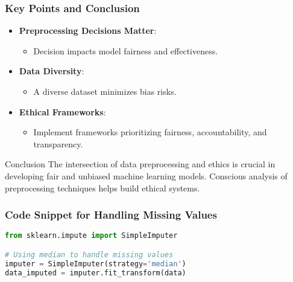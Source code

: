 \documentclass[aspectratio=169]{beamer}
\begin{document}
\begin{frame}[fragile]
    \frametitle{Key Points and Conclusion}
    \begin{itemize}
        \item \textbf{Preprocessing Decisions Matter}:
        \begin{itemize}
            \item Decision impacts model fairness and effectiveness.
        \end{itemize}

        \item \textbf{Data Diversity}:
        \begin{itemize}
            \item A diverse dataset minimizes bias risks.
        \end{itemize}

        \item \textbf{Ethical Frameworks}:
        \begin{itemize}
            \item Implement frameworks prioritizing fairness, accountability, and transparency.
        \end{itemize}
    \end{itemize}

    \begin{block}{Conclusion}
        The intersection of data preprocessing and ethics is crucial in developing fair and unbiased machine learning models. Conscious analysis of preprocessing techniques helps build ethical systems.
    \end{block}
\end{frame}

\begin{frame}[fragile]
    \frametitle{Code Snippet for Handling Missing Values}
    \begin{lstlisting}[language=Python]
from sklearn.impute import SimpleImputer

# Using median to handle missing values
imputer = SimpleImputer(strategy='median')
data_imputed = imputer.fit_transform(data)
    \end{lstlisting}
\end{frame}
\end{document}
